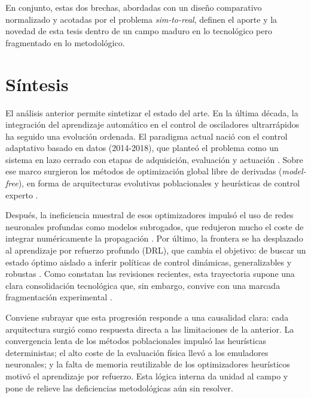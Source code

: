 En conjunto, estas dos brechas, abordadas con un diseño comparativo normalizado y acotadas por el problema \emph{sim-to-real}, definen el aporte y la novedad de esta tesis dentro de un campo maduro en lo tecnológico pero fragmentado en lo metodológico.

\section{Síntesis}
\label{sec:sintesis}
El análisis anterior permite sintetizar el estado del arte. En la última década, la integración del aprendizaje automático en el control de osciladores ultrarrápidos ha seguido una evolución ordenada. El paradigma actual nació con el control adaptativo basado en datos (2014-2018), que planteó el problema como un sistema en lazo cerrado con etapas de adquisición, evaluación y actuación \cite{BruntonFuKutz2014, Baumeister2018}. Sobre ese marco surgieron los métodos de optimización global libre de derivadas (\emph{model-free}), en forma de arquitecturas evolutivas poblacionales \cite{Andral2015, Woodward2016} y heurísticas de control experto \cite{Pu2019}.

Después, la ineficiencia muestral de esos optimizadores impulsó el uso de redes neuronales profundas como modelos subrogados, que redujeron mucho el coste de integrar numéricamente la propagación \cite{Salmela2021}. Por último, la frontera se ha desplazado al aprendizaje por refuerzo profundo (DRL), que cambia el objetivo: de buscar un estado óptimo aislado a inferir políticas de control dinámicas, generalizables y robustas \cite{Kokhanovskiy2022, Kokhanovskiy2024}. Como constatan las revisiones recientes, esta trayectoria supone una clara consolidación tecnológica que, sin embargo, convive con una marcada fragmentación experimental \cite{Genty2021, Jiang2022}.

Conviene subrayar que esta progresión responde a una causalidad clara: cada arquitectura surgió como respuesta directa a las limitaciones de la anterior. La convergencia lenta de los métodos poblacionales impulsó las heurísticas deterministas; el alto coste de la evaluación física llevó a los emuladores neuronales; y la falta de memoria reutilizable de los optimizadores heurísticos motivó el aprendizaje por refuerzo. Esta lógica interna da unidad al campo y pone de relieve las deficiencias metodológicas aún sin resolver.

